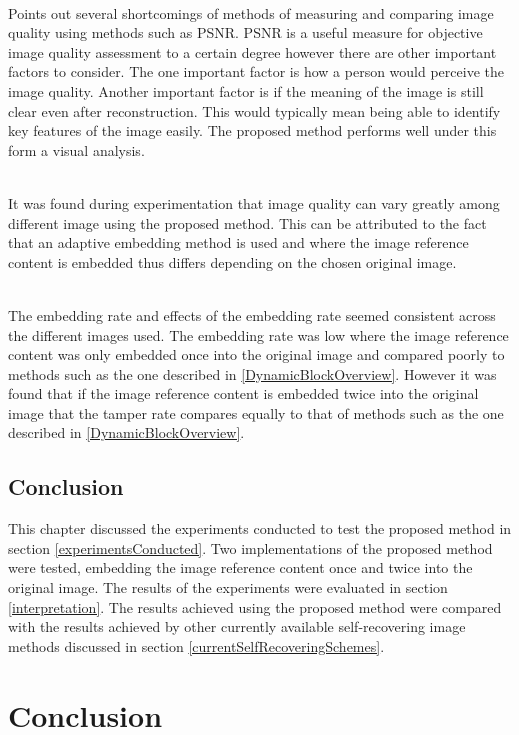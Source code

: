 \documentclass[12pt]{article}
\begin{document}
\hspace{0pt} \\
\cite{wang2002image} Points out several shortcomings of methods of measuring and comparing image quality using methods such as PSNR. 
PSNR is a useful measure for objective image quality assessment to a certain degree however there are other important factors to consider. 
The one important factor is how a person would perceive the image quality.
Another important factor is if the meaning of the image is still clear even after reconstruction.
This would typically mean being able to identify key features of the image easily. 
The proposed method performs well under this form a visual analysis.

\hspace{0pt} \\
It was found during experimentation that image quality can vary greatly among different image using the proposed method.
This can be attributed to the fact that an adaptive embedding method is used and where the image reference content is embedded thus differs depending on the chosen original image.

\hspace{0pt} \\
The embedding rate and effects of the embedding rate seemed consistent across the different images used.
The embedding rate was low where the image reference content was only embedded once into the original image and compared poorly to methods such as the one described in \ref{DynamicBlockOverview}.
However it was found that if the image reference content is embedded twice into the original image that the tamper rate compares equally to that of methods such as the one described in \ref{DynamicBlockOverview}.

\subsection{Conclusion}
This chapter discussed the experiments conducted to test the proposed method in section \ref{experimentsConducted}.
Two implementations of the proposed method were tested, embedding the image reference content once and twice into the original image.
The results of the experiments were evaluated in section \ref{interpretation}.
The results achieved using the proposed method were compared with the results achieved by other currently available self-recovering image methods discussed in section \ref{currentSelfRecoveringSchemes}.  

\section{Conclusion}
\end{document}
